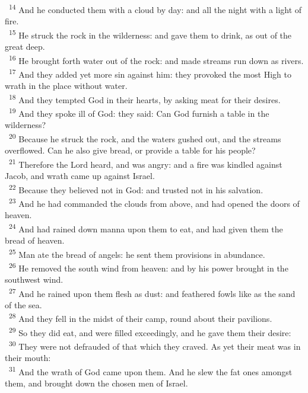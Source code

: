 \documentclass[a5paper,12pt]{article}
\begin{document}
\begin{multicols*}{2}
~\textsuperscript{14} And he conducted them with a cloud by day: and all the night with a light of fire.\\
~\textsuperscript{15} He struck the rock in the wilderness: and gave them to drink, as out of the great deep.\\
~\textsuperscript{16} He brought forth water out of the rock: and made streams run down as rivers.\\
~\textsuperscript{17} And they added yet more sin against him: they provoked the most High to wrath in the place without water.\\
~\textsuperscript{18} And they tempted God in their hearts, by asking meat for their desires.\\
~\textsuperscript{19} And they spoke ill of God: they said: Can God furnish a table in the wilderness?\\
~\textsuperscript{20} Because he struck the rock, and the waters gushed out, and the streams overflowed. Can he also give bread, or provide a table for his people?\\
~\textsuperscript{21} Therefore the Lord heard, and was angry: and a fire was kindled against Jacob, and wrath came up against Israel.\\
~\textsuperscript{22} Because they believed not in God: and trusted not in his salvation.\\
~\textsuperscript{23} And he had commanded the clouds from above, and had opened the doors of heaven.\\
~\textsuperscript{24} And had rained down manna upon them to eat, and had given them the bread of heaven.\\
~\textsuperscript{25} Man ate the bread of angels: he sent them provisions in abundance.\\
~\textsuperscript{26} He removed the south wind from heaven: and by his power brought in the southwest wind.\\
~\textsuperscript{27} And he rained upon them flesh as dust: and feathered fowls like as the sand of the sea.\\
~\textsuperscript{28} And they fell in the midst of their camp, round about their pavilions.\\
~\textsuperscript{29} So they did eat, and were filled exceedingly, and he gave them their desire:\\
~\textsuperscript{30} They were not defrauded of that which they craved. As yet their meat was in their mouth:\\
~\textsuperscript{31} And the wrath of God came upon them. And he slew the fat ones amongst them, and brought down the chosen men of Israel.\\

\end{multicols*}
\end{document}
